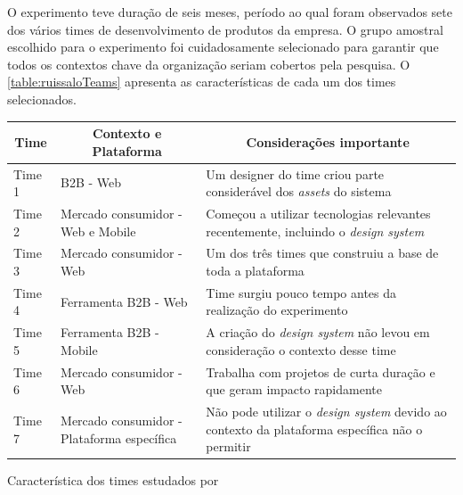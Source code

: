 O experimento teve duração de seis meses, período ao qual foram observados sete dos vários times de desenvolvimento de produtos da empresa. O grupo amostral escolhido para o experimento foi cuidadosamente selecionado para garantir que todos os contextos chave da organização seriam cobertos pela pesquisa. O \autoref{table:ruissaloTeams} apresenta as características de cada um dos times selecionados.

\begin{quadro}
  \centering
  \begin{tabular}{|m{2cm}|m{4cm}|m{8cm}|} \hline
    
    \multicolumn{1}{|c|}{\bfseries Time} & \multicolumn{1}{c|}{\bfseries Contexto e Plataforma} & \multicolumn{1}{c|}{\bfseries Considerações importante} \\\hline
    
     Time 1 & B2B - Web & Um designer do time criou parte considerável dos \textit{assets} do sistema \\\hline
     
     Time 2 & Mercado consumidor - Web e Mobile & Começou a utilizar tecnologias relevantes recentemente, incluindo o \textit{design system} \\\hline
     
     Time 3 & Mercado consumidor - Web & Um dos três times que construiu a base de toda a plataforma \\\hline
     
     Time 4 & Ferramenta B2B - Web & Time surgiu pouco tempo antes da realização do experimento \\\hline
     
     Time 5 & Ferramenta B2B - Mobile & A criação do \textit{design system} não levou em consideração o contexto desse time \\\hline
     
     Time 6 & Mercado consumidor - Web & Trabalha com projetos de curta duração e que geram impacto rapidamente \\\hline
     
     Time 7 & Mercado consumidor - Plataforma específica & Não pode utilizar o \textit{design system} devido ao contexto da plataforma específica não o permitir \\\hline
     
      
  \end{tabular}
  \caption{Característica dos times estudados por }
  \label{table:ruissaloTeams}
\end{quadro}

